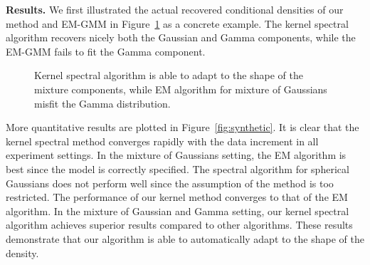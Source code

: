 \documentclass{article}
\begin{document}
{\bf Results.} We first illustrated the actual recovered conditional densities of our method and EM-GMM in Figure~\ref{fig:shape} as a concrete example. The kernel spectral algorithm recovers nicely both the Gaussian and Gamma components, while the EM-GMM fails to fit the Gamma component.

\begin{figure}[t]
	\vspace{-3mm}
	\vspace{-4mm}
  \caption{Kernel spectral algorithm is able to adapt to the shape of the mixture components, while EM algorithm for mixture of Gaussians misfit the Gamma distribution.}\label{fig:shape}
	\vspace{-3mm}
\end{figure}

More quantitative results are plotted in Figure~\ref{fig:synthetic}. It is clear that the kernel spectral method converges rapidly with the data increment in all experiment settings. In the mixture of Gaussians setting, the EM algorithm is best since the model is correctly specified. The spectral algorithm for spherical Gaussians does not perform well since the assumption of the method is too restricted. The performance of our kernel method converges to that of the EM algorithm. In the mixture of Gaussian and Gamma setting, our kernel spectral algorithm achieves superior results compared to other algorithms. These results demonstrate that our algorithm is able to automatically adapt to the shape of the density.
\end{document}
